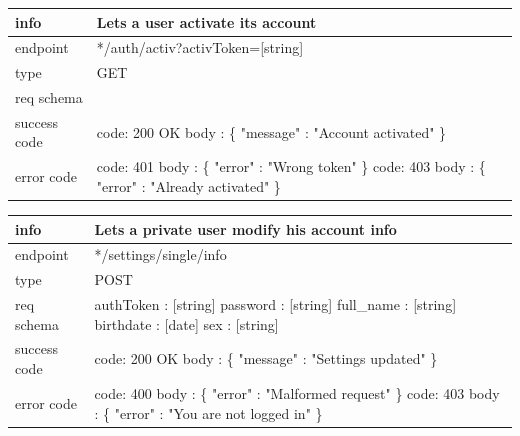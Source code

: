 \documentclass[titlepage]{article}
\begin{document}
\vspace{\baselineskip}

\begin{tabularx}{\textwidth}{lX} \hline
    info & Lets a user activate its account \\ \hline
    endpoint & */auth/activ?activToken=[string] \\ \hline
    type & GET \\ \hline
    req schema & \\ \hline
    success code &
        code: 200 OK \newline \newline 
        body : \{ \newline
        "message" : "Account activated" \newline
        \} \\ \hline
    error code &
        code: 401 \newline
        body : \{ "error" : "Wrong token" \} \newline \newline
        code: 403 \newline
        body : \{ "error" : "Already activated" \} \\ \hline
\end{tabularx}
		
\vspace{\baselineskip}

\begin{tabularx}{\textwidth}{lX} \hline
    info & Lets a private user modify his account info \\ \hline
    endpoint & */settings/single/info \\ \hline
    type & POST \\ \hline
    req schema & 
        authToken : [string] \newline
        password : [string] \newline
        full\_name : [string] \newline
        birthdate : [date] \newline
        sex : [string] \\ \hline
    success code &
        code: 200 OK \newline \newline 
        body : \{ \newline
        "message" : "Settings updated" \newline
        \} \\ \hline
    error code &
        code: 400 \newline
        body : \{ "error" : "Malformed request" \} \newline \newline
        code: 403 \newline
        body : \{ "error" : "You are not logged in" \} \\ \hline
\end{tabularx}
		
\end{document}
